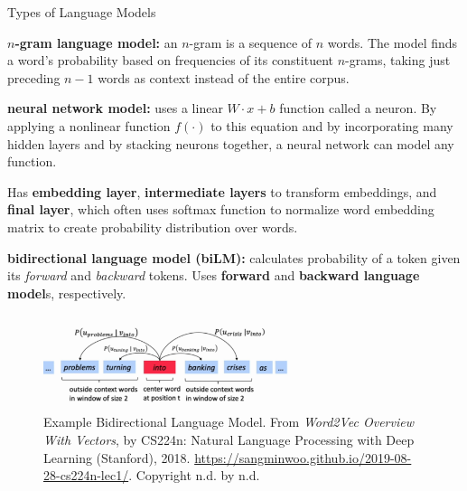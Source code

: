 \begin{frame}{Types of Language Models}
    

\begin{itemizeSpaced}{5pt}
    \item \textbf{$n$-gram language model: } an $n$-gram is a sequence of $n$ words. The model finds a word's probability based on frequencies of its constituent $n$-grams, taking just preceding $n-1$ words as context instead of the entire corpus. 
    
    \item \textbf{neural network model: } uses a linear $W \cdot x + b$ function called a neuron. By applying a nonlinear function $f(\cdot)$ to this equation and by incorporating many hidden layers and by stacking neurons together, a neural network can model any function.
    
    Has \textbf{embedding layer}, \textbf{intermediate layers} to transform embeddings, and \textbf{final layer}, which often uses softmax function to normalize word embedding matrix to create probability distribution over words. 
    
    \item \textbf{bidirectional language model (biLM): } calculates probability of a token given its \emph{forward} and \emph{backward} tokens. Uses \textbf{forward} and \textbf{backward language model}s, respectively. 
    
    
    

    \begin{figure}[h]
    \vspace{-5pt}
    \centering
    \includegraphics[width=0.65\textwidth]{imgs/bidirectional_languagemodel_banking.png}
    \vspace{-10pt}
    \caption{\tiny Example Bidirectional Language Model. From \emph{Word2Vec Overview With Vectors}, by CS224n: Natural Language Processing with Deep Learning (Stanford), 2018. \url{https://sangminwoo.github.io/2019-08-28-cs224n-lec1/}. Copyright n.d. by n.d.}
    \vspace{-5pt}
    \label{fig:bidirectionalLM}
    \end{figure}
    
\end{itemizeSpaced}

\end{frame}




